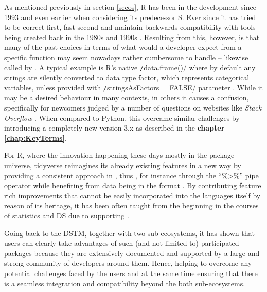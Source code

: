 As mentioned previously in section \ref{secos}, R has been in the development since 1993 and even earlier when considering its predecessor S. 
Ever since it has tried to be correct first, fast second and maintain backwards compatibility with tools being created back in the 1980s and 1990s \parencite{BlasMartinSlow2018}.
Resulting from this, however, is that many of the past choices in terms of what would a developer expect from a specific function may seem nowadays rather cumbersome to handle -- likewise called  by \textcite{RossZ2017DeclutterTools}. 
A typical example is R's native \texttt/data.frame()/ where by default any strings are silently converted to data type factor, which represents categorical variables, unless  provided with \texttt/stringsAsFactors = FALSE/ parameter \parencite{PengStringFactor2015}. 
While it may be a desired behaviour in many contexts, in others it causes a confusion, specifically for newcomers judged by a number of questions on websites like \emph{Stack Overflow} \parencite{WinVektro2014}. 
When compared to Python, this overcame similar challenges by introducing a completely new version 3.x as described in the \textbf{chapter \ref{chap:KeyTerms}}.

For R, where the innovation happening these days mostly in the package universe, tidyverse reimagines its already existing features in a new way by providing a consistent approach in , thus , for instance through the \enquote{\%>\%} pipe operator while benefiting from data being in the  format \parencite[2-3]{RossZ2017DeclutterTools}.
By contributing feature rich improvements that cannot be easily incorporated into the languages itself by reason of its heritage, it has been often taught from the beginning in the courses of statistics and \ac{DS} due to supporting  \parencites{KellyPosterUSerRBrussels2017}{Rickert2017}.

Going back to the \ac{DSTM}, together with two sub-ecosystems, it has shown that users can clearly take advantages of such (and not limited to) participated packages because they are extensively documented and supported by a large and strong community of developers around them. 
Hence, helping to overcome any potential challenges faced by the users and at the same time ensuring that there is a seamless integration and compatibility beyond the both sub-ecosystems.

